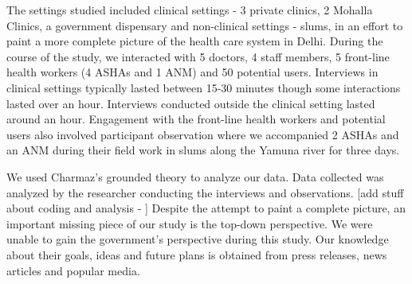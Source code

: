 The settings studied included clinical settings - 3 private clinics, 2 Mohalla Clinics, a government dispensary and non-clinical settings - slums, in an effort to paint a more complete picture of the health care system in Delhi. During the course of the study, we interacted with 5 doctors, 4 staff members, 5 front-line health workers (4 ASHAs and 1 ANM) and 50 potential users. Interviews in clinical settings typically lasted between 15-30 minutes though some interactions lasted over an hour. Interviews conducted outside the clinical setting lasted around an hour. Engagement with the front-line health workers and potential users also involved participant observation where we accompanied 2 ASHAs and an ANM during their field work in slums along the Yamuna river for three days.

We used Charmaz's grounded theory 
to analyze our data. Data collected was analyzed by the researcher conducting the interviews and observations. [add stuff about coding and analysis - ]
Despite the attempt to paint a complete picture, an important missing piece of our study is the top-down perspective. We were unable to gain the government's perspective during this study. Our knowledge about their goals, ideas and future plans is obtained from press releases, news articles and popular media. 

